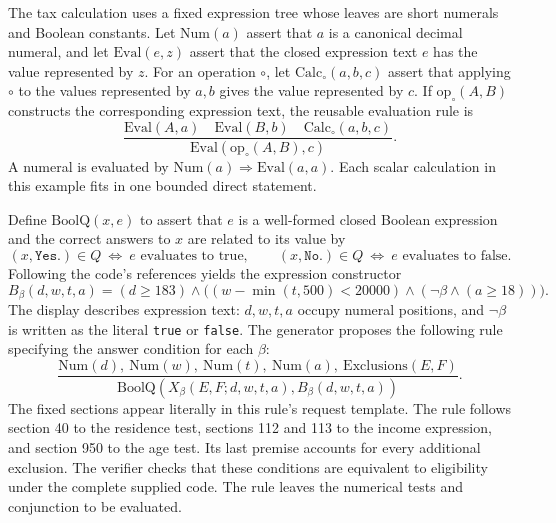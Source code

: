 \documentclass[11pt,twoside]{article}
\theoremstyle{definition}
\begin{document}
The tax calculation uses a fixed expression tree whose leaves are short
numerals and Boolean constants. Let $\mathrm{Num}(a)$ assert that $a$ is a
canonical decimal numeral, and let $\mathrm{Eval}(e,z)$ assert that the closed
expression text $e$ has the value represented by $z$. For an operation
$\circ$, let $\mathrm{Calc}_{\circ}(a,b,c)$ assert that applying $\circ$ to
the values represented by $a,b$ gives the value represented by $c$. If
$\mathrm{op}_{\circ}(A,B)$ constructs the corresponding expression text, the
reusable evaluation rule is
\begin{equation}
 \frac{\mathrm{Eval}(A,a)\quad \mathrm{Eval}(B,b)\quad
       \mathrm{Calc}_{\circ}(a,b,c)}
      {\mathrm{Eval}(\mathrm{op}_{\circ}(A,B),c)}.
\label{eq:eval-compose}
\end{equation}
A numeral is evaluated by
$\mathrm{Num}(a)\Rightarrow\mathrm{Eval}(a,a)$. Each scalar calculation in
this example fits in one bounded direct statement.

Define $\mathrm{BoolQ}(x,e)$ to assert that $e$ is a well-formed closed Boolean
expression and the correct answers to $x$ are related to its value by
\begin{equation}
 (x,\texttt{Yes.})\in Q\ \Longleftrightarrow\ e\text{ evaluates to true},
 \qquad
 (x,\texttt{No.})\in Q\ \Longleftrightarrow\ e\text{ evaluates to false}.
\end{equation}
Following the code's references yields the expression constructor
\begin{equation}
 B_{\beta}(d,w,t,a)=
 (d\ge183)\wedge
 \bigl((w-\min(t,500)<20000)\wedge
       (\neg\beta\wedge(a\ge18))\bigr).
\label{eq:tax-condition}
\end{equation}
The display describes expression text: $d,w,t,a$ occupy numeral positions,
and $\neg\beta$ is written as the literal \texttt{true} or \texttt{false}.
The generator proposes the following rule specifying the answer condition
for each $\beta$:
\begin{equation}
 \frac{\mathrm{Num}(d),\ \mathrm{Num}(w),\ \mathrm{Num}(t),\
 \mathrm{Num}(a),\ \mathrm{Exclusions}(E,F)}
 {\mathrm{BoolQ}(X_{\beta}(E,F;d,w,t,a),B_{\beta}(d,w,t,a))}.
\label{eq:tax-specification}
\end{equation}
The fixed sections appear literally in this rule's request template.
The rule follows section 40 to the residence test, sections 112 and 113 to
the income expression, and section 950 to the age test. Its last premise
accounts for every additional exclusion. The verifier checks that these
conditions are equivalent to eligibility under the complete supplied code.
The rule leaves the numerical tests and conjunction to be evaluated.
\end{document}
